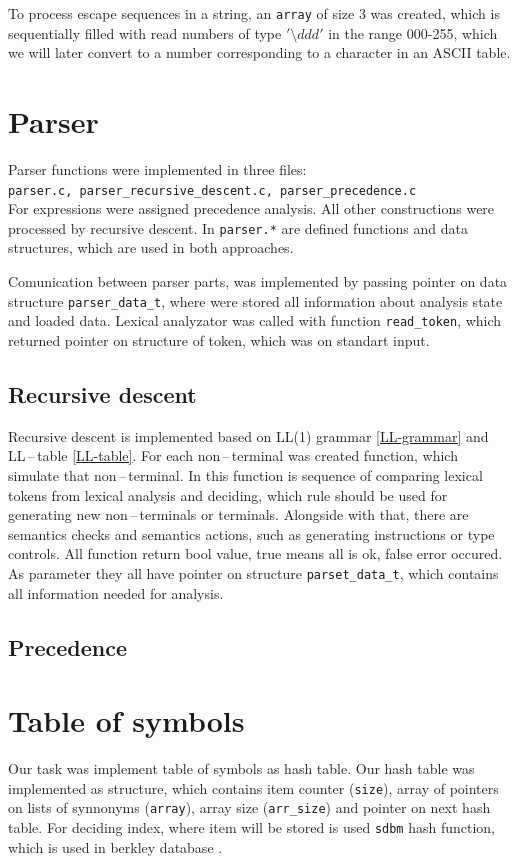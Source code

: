 \documentclass[11pt]{article}
\begin{document}
To process escape sequences in a string, an \texttt{array} of size 3 was created, which is sequentially filled with read numbers of type $'\setminus{ddd}'$ in the range 000-255, which we will later convert to a number corresponding to a character in an ASCII table.

\section{Parser}
Parser functions were implemented in three files:\\ \texttt{parser.c, parser\_recursive\_descent.c, parser\_precedence.c} \\
For expressions were assigned precedence analysis. All other constructions were processed by recursive descent.
In \texttt{parser.*} are defined functions and data structures, which are used in both approaches.

Comunication between parser parts, was implemented by passing pointer on data structure \texttt{parser\_data\_t}, 
where were stored all information about analysis state and loaded data. Lexical analyzator was called with function \texttt{read\_token},
which returned pointer on structure of token, which was on standart input.

\subsection{Recursive descent}
Recursive descent is implemented based on LL(1) grammar \ref{LL-grammar} and LL\,--\,table \ref{LL-table}. For each non\,--\,terminal was created function,
which simulate that non\,--\,terminal. In this function is sequence of comparing lexical tokens from lexical analysis and deciding, which rule should be used for generating new non\,--\,terminals or terminals.
Alongside with that, there are semantics checks and semantics actions, such as generating instructions or type controls. All function return bool value, true means all is ok, false error occured.
As parameter they all have pointer on structure \texttt{parset\_data\_t}, which contains all information needed for analysis. 

\subsection{Precedence}

\section{Table of symbols}
Our task was implement table of symbols as hash table. Our hash table was implemented as structure, which contains item counter (\texttt{size}), array of pointers on lists of synnonyms (\texttt{array}),
array size (\texttt{arr\_size}) and pointer on next hash table. For deciding index, where item will be stored is used \texttt{sdbm} hash function, which is used in berkley database \cite{hash_function}. 
\end{document}
